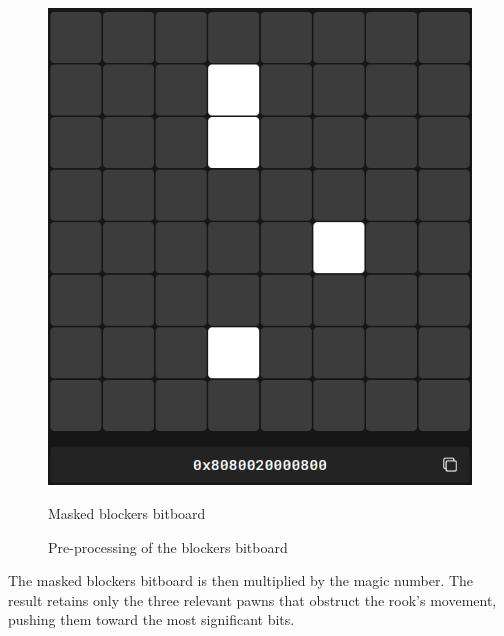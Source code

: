 \begin{figure}[H]
\begin{minipage}[c]{0.4\textwidth}
        \includegraphics[width=\textwidth]{Imagenes/magics_processed_blockers.png}
        \caption{Masked blockers bitboard}
    \end{minipage}
    \caption*{Pre-processing of the blockers bitboard}\label{fig:magic_preprocessing}
\end{figure}

\noindent The masked blockers bitboard is then multiplied by the magic number. The result retains only the three relevant pawns that obstruct the rook's movement, pushing them toward the most significant bits.

\vspace{1em}

